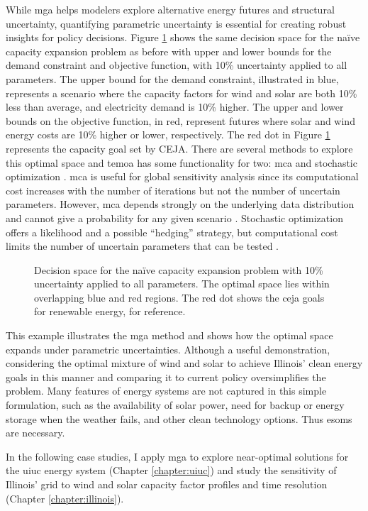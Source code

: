 While \gls{mga} helps modelers explore alternative energy futures and structural
uncertainty, quantifying parametric uncertainty is essential for creating robust insights
for policy decisions. Figure \ref{fig:param-fig} shows the same decision space for
the na\"{i}ve capacity expansion problem as before with upper and lower bounds for
the demand constraint and objective function, with 10\% uncertainty applied to all
parameters. The upper bound for the demand constraint, illustrated in blue,
represents a scenario where
the capacity factors for wind and solar are both 10\% less than average, and electricity
demand is 10\% higher. The upper and lower bounds on the objective function, in red,
represent futures where solar and wind energy costs are 10\% higher or lower,
respectively. The red dot in Figure \ref{fig:param-fig} represents the
capacity goal set by CEJA. There are several methods to explore this optimal space and
\gls{temoa} has some functionality for two: \gls{mca} \cite{yue_review_2018} and
stochastic optimization \cite{decarolis_multi-stage_2012, bennett_extending_2021}.
\gls{mca} is useful for global sensitivity analysis since its computational
cost increases with the number of iterations but not the number of uncertain
parameters. However, \gls{mca} depends strongly on the underlying data distribution
and cannot give a probability for any given scenario \cite{yue_review_2018}.
Stochastic optimization offers a likelihood and a possible ``hedging'' strategy,
but computational cost limits the number of uncertain parameters that can be
tested \cite{yue_review_2018}.

\begin{figure}[H]
  \centering
  \resizebox{0.8\columnwidth}{!}{}
  \caption{Decision space for the na\"{i}ve capacity expansion problem with
  10\% uncertainty applied to all parameters. The optimal space lies within
  overlapping blue and red regions. The red dot shows the \gls{ceja} goals for
  renewable energy, for reference.}
  \label{fig:param-fig}
\end{figure}

This example illustrates the \gls{mga} method and shows how the optimal space
expands under parametric uncertainties.
Although a useful demonstration, considering the optimal mixture of wind and solar
to achieve Illinois' clean energy goals in this manner and comparing it to
current policy oversimplifies the problem.
Many features of energy systems are not captured in this simple formulation,
such as the availability of solar power, need for backup or energy storage when
the weather fails, and other clean technology options. Thus \glspl{esom} are necessary.

In the following case studies, I apply \gls{mga} to explore near-optimal solutions
for the \gls{uiuc} energy system (Chapter \ref{chapter:uiuc}) and study the
sensitivity of Illinois' grid to wind and solar capacity factor profiles and time
resolution (Chapter \ref{chapter:illinois}).
